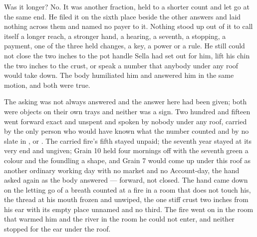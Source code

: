 Was it longer? No. It was another fraction, held to a shorter count and let go at the same end. He filed it on the sixth place beside the other answers and laid nothing across them and named no payer to it. Nothing stood up out of it to call itself a longer reach, a stronger hand, a hearing, a seventh, a stopping, a payment, one of the three held changes, a key, a power or a rule. He still could not close the two inches to the pot handle Sella had set out for him, lift his chin the two inches to the crust, or speak a number that anybody under any roof would take down. The body humiliated him and answered him in the same motion, and both were true.

The asking was not always answered and the answer here had been given; both were objects on their own trays and neither was a sign. Two hundred and fifteen went forward exact and unspent and spoken by nobody under any roof, carried by the only person who would have known what the number counted and by no slate in ,  or . The carried fire's fifth stayed unpaid; the seventh year stayed at its very end and ungiven; Grain 10 held four mornings off with the seventh green a colour and the foundling a shape, and Grain 7 would come up under this roof as another ordinary working day with no market and no Account-day, the hand asked again as the body answered --- forward, not closed. The hand came down on the letting go of a breath counted at a fire in a room that does not touch his, the thread at his mouth frozen and unwiped, the one stiff crust two inches from his ear with its empty place unnamed and no third. The fire went on in the room that warmed him and the river in the room he could not enter, and neither stopped for the ear under the roof.
